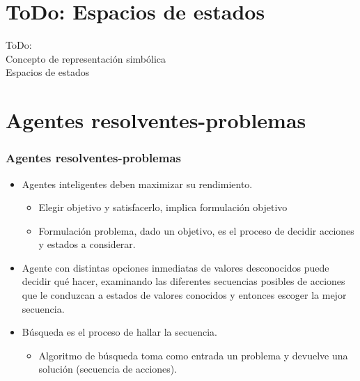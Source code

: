 \documentclass{beamer}
\begin{document}
\section{ToDo: Espacios de estados}

\begin{frame}  \small  

ToDo: \\

Concepto de representación simbólica\\
Espacios de estados

\end{frame} 


\section{Agentes resolventes-problemas}

\begin{frame} \frametitle{Agentes resolventes-problemas} \footnotesize

\begin{itemize}
\item Agentes inteligentes deben maximizar su rendimiento.

\begin{itemize}
\item Elegir objetivo y satisfacerlo, implica formulación objetivo
\item Formulación problema, dado un objetivo, es el proceso de decidir acciones y estados a considerar.
\end{itemize}


\item Agente con distintas opciones inmediatas de valores desconocidos puede decidir qué hacer, examinando las diferentes secuencias posibles de acciones que le conduzcan a estados de valores conocidos y entonces escoger la mejor secuencia.


\item Búsqueda es el proceso de hallar la secuencia.

\begin{itemize}
\item Algoritmo de búsqueda toma como entrada un problema y devuelve una solución (secuencia de acciones).
\end{itemize}

\end{itemize}

\end{frame} 
\end{document}
